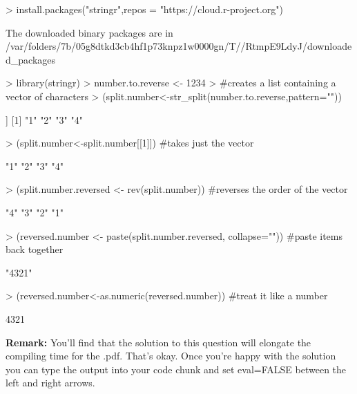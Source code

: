 \documentclass{article}
\begin{document}
\begin{enumerate}
\begin{Schunk}
\begin{Sinput}
> install.packages("stringr",repos = "https://cloud.r-project.org")
\end{Sinput}
\begin{Soutput}
The downloaded binary packages are in
	/var/folders/7b/05g8dtkd3cb4hf1p73knpz1w0000gn/T//RtmpE9LdyJ/downloaded_packages
\end{Soutput}
\begin{Sinput}
> library(stringr)
> number.to.reverse <- 1234
> #creates a list containing a vector of characters
> (split.number<-str_split(number.to.reverse,pattern=""))
\end{Sinput}
\begin{Soutput}
[[1]]
[1] "1" "2" "3" "4"
\end{Soutput}
\begin{Sinput}
> (split.number<-split.number[[1]]) #takes just the vector
\end{Sinput}
\begin{Soutput}
[1] "1" "2" "3" "4"
\end{Soutput}
\begin{Sinput}
> (split.number.reversed <- rev(split.number)) #reverses the order of the vector
\end{Sinput}
\begin{Soutput}
[1] "4" "3" "2" "1"
\end{Soutput}
\begin{Sinput}
> (reversed.number <- paste(split.number.reversed, collapse="")) #paste items back together
\end{Sinput}
\begin{Soutput}
[1] "4321"
\end{Soutput}
\begin{Sinput}
> (reversed.number<-as.numeric(reversed.number)) #treat it like a number
\end{Sinput}
\begin{Soutput}
[1] 4321
\end{Soutput}
\end{Schunk}
\textbf{Remark:} You'll find that the solution to this question will elongate the
compiling time for the .pdf. That's okay. Once you're happy with the solution 
you can type the output into your code chunk and set eval=FALSE between the left
and right arrows.


\end{enumerate}
\end{document}
